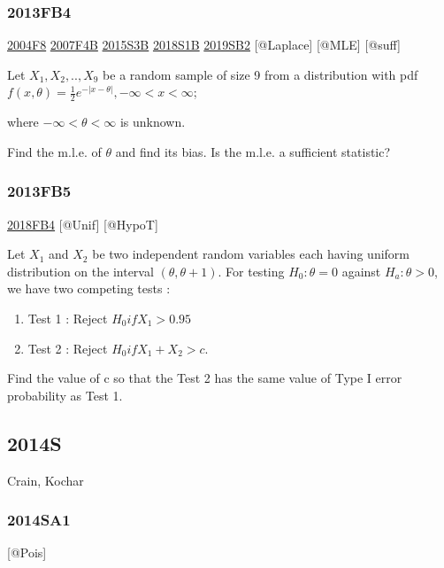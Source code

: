 \documentclass[6pt,twocolumn,Portrait]{article}
\begin{document}
\hypertarget{fb4-2}{%
\subsubsection{2013FB4}\label{fb4-2}}

\protect\hyperlink{f8-2}{2004F8} \protect\hyperlink{f4b}{2007F4B}
\protect\hyperlink{s3b-1}{2015S3B} \protect\hyperlink{s1b-2}{2018S1B}
\protect\hyperlink{sb2-3}{2019SB2} {[}@Laplace{]} {[}@MLE{]} {[}@suff{]}

Let \(X_1,X_2,..,X_9\) be a random sample of size 9 from a distribution
with pdf \(f(x,\theta) =\frac12e^{-|x-\theta|}, -\infty<x<\infty\);

where \(-\infty<\theta<\infty\) is unknown.

Find the m.l.e. of \(\theta\) and find its bias. Is the m.l.e. a
sufficient statistic?

\hypertarget{fb5}{%
\subsubsection{2013FB5}\label{fb5}}

\protect\hyperlink{fb4-4}{2018FB4} {[}@Unif{]} {[}@HypoT{]}

Let \(X_1\) and \(X_2\) be two independent random variables each having
uniform distribution on the interval \((\theta,\theta+1)\). For testing
\(H_0:\theta=0\) against \(H_a:\theta> 0\), we have two competing tests
:

\begin{enumerate}
\def\labelenumi{\arabic{enumi}.}
\item
  Test 1 : Reject \(H_0 if X_1>0.95\)
\item
  Test 2 : Reject \(H_0 if X_1+X_2>c\).
\end{enumerate}

Find the value of c so that the Test 2 has the same value of Type I
error probability as Test 1.

\hypertarget{s-7}{%
\subsection{2014S}\label{s-7}}

Crain, Kochar

\hypertarget{sa1-2}{%
\subsubsection{2014SA1}\label{sa1-2}}

{[}@Pois{]}
\end{document}
